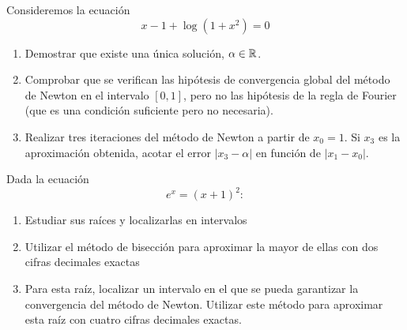 \begin{EjerciciosPropuestos}
\begin{problema}
   \end{problema}


   \begin{problema}
     Consideremos la ecuación
     $$
     x-1 + \log(1+x^2) = 0
     $$
     \begin{enumerate}
     \item Demostrar que existe una única solución, $\alpha\in\operatorname{{\mathbb R}}$.
     \item Comprobar que se verifican las hipótesis de convergencia
       global del método de Newton en el intervalo $[0,1]$, pero no
       las hipótesis de la regla de Fourier (que es una condición
       suficiente pero no necesaria).
     \item Realizar tres iteraciones del método de Newton a partir de
       $x_0=1$. Si $x_3$ es la aproximación obtenida, acotar el error
       $|x_3-\alpha|$ en función de $|x_1-x_0|$.
     \end{enumerate}
   \end{problema}

   \begin{problema}
     Dada la ecuación $$e^x=(x+1)^2:$$
     \begin{enumerate}
     \item Estudiar sus raíces y localizarlas en intervalos
     \item Utilizar el método de bisección para aproximar la mayor de
       ellas con dos cifras decimales exactas
     \item Para esta raíz, localizar un intervalo en el que se pueda
       garantizar la convergencia del método de Newton. Utilizar este
       método para aproximar esta raíz con cuatro cifras decimales
       exactas.
     \end{enumerate}
   \end{problema}
 \end{EjerciciosPropuestos}


